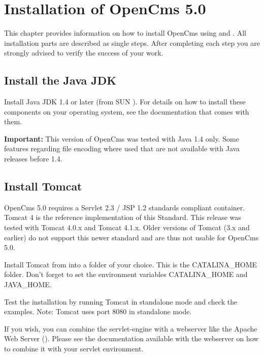 \chapter{Installation of OpenCms 5.0}
\label{installation}

This chapter provides information on how to install OpenCms using
 and
. All installation parts are
described as single steps. After completing each step you are
strongly advised to verify the success of your work.

\section{Install the Java JDK}
Install Java JDK 1.4 or later (from SUN
).
For details on how to install these components on your operating
system, see the documentation that comes with them.

\textbf{Important:} This version of OpenCms was tested with Java 1.4 only. 
Some features regarding file encoding where used that are not available with Java releases before 1.4.

\section{Install Tomcat}
OpenCms 5.0 requires a Servlet 2.3 / JSP 1.2 standards compliant container. 
Tomcat 4 is the reference implementation of this Standard. 
This release was tested with Tomcat 4.0.x and Tomcat 4.1.x. 
Older versions of Tomcat (3.x and earlier) do not support this newer standard and are thus not usable for OpenCms 5.0.

Install Tomcat from
into a folder of your choice. This is the CATALINA\_HOME folder.
Don't forget to set the environment variables CATALINA\_HOME and
JAVA\_HOME.

Test the installation by running Tomcat in standalone mode and
check the examples. Note: Tomcat uses port 8080 in standalone
mode.
 
If you wish, you can combine the servlet-engine with a webserver
like the Apache Web Server
().
Please see the documentation available with the webserver on how to combine it with your servlet environment.

